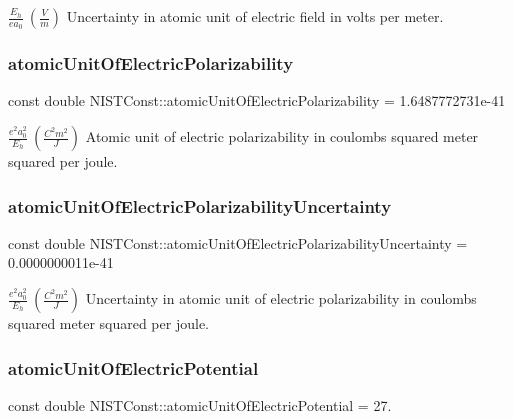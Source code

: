$\frac{E_h}{e a_0} \ (\frac{V}{m})$ Uncertainty in atomic unit of electric field in volts per meter. \mbox{\label{group___n_i_s_t_const-_atomic_unit_ga5809393ec8d30cbb7e0c7a2f168e48ec}} 
\subsubsection{\texorpdfstring{atomic\+Unit\+Of\+Electric\+Polarizability}{atomicUnitOfElectricPolarizability}}
{\footnotesize\ttfamily const double N\+I\+S\+T\+Const\+::atomic\+Unit\+Of\+Electric\+Polarizability = 1.\+6487772731e-\/41}

$\frac{e^2 a_0^2}{E_h} \ (\frac{C^2 m^2}{J})$ Atomic unit of electric polarizability in coulombs squared meter squared per joule. \mbox{\label{group___n_i_s_t_const-_atomic_unit_ga2ef1ea59315d53669e7c5e38fc4dc6b7}} 
\subsubsection{\texorpdfstring{atomic\+Unit\+Of\+Electric\+Polarizability\+Uncertainty}{atomicUnitOfElectricPolarizabilityUncertainty}}
{\footnotesize\ttfamily const double N\+I\+S\+T\+Const\+::atomic\+Unit\+Of\+Electric\+Polarizability\+Uncertainty = 0.\+0000000011e-\/41}

$\frac{e^2 a_0^2}{E_h} \ (\frac{C^2 m^2}{J})$ Uncertainty in atomic unit of electric polarizability in coulombs squared meter squared per joule. \mbox{\label{group___n_i_s_t_const-_atomic_unit_ga139c6486b1899658838d403380fc229a}} 
\subsubsection{\texorpdfstring{atomic\+Unit\+Of\+Electric\+Potential}{atomicUnitOfElectricPotential}}
{\footnotesize\ttfamily const double N\+I\+S\+T\+Const\+::atomic\+Unit\+Of\+Electric\+Potential = 27.}

